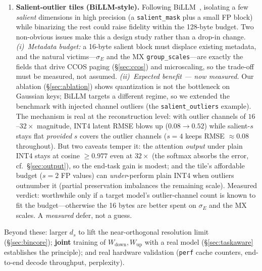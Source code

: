 \documentclass[11pt]{article}
\theoremstyle{plain}
\theoremstyle{definition}
\newcommand{\ds}{d_s}
\newcommand{\sigE}{\sigma_E}
\begin{document}
\begin{enumerate}[leftmargin=1.6em,itemsep=2pt]
    $\Rightarrow$ 128'' assumption we measured and discarded. For
    cross-compilation the host line size is irrelevant, so the safe 64-byte
    default holds. A portability refinement, not a correctness change: the tile
    stays 128~bytes with zero padding either way, and on every one of our
    targets the result is unchanged (\texttt{align(64)}).
  \item \textbf{Salient-outlier tiles (BiLLM-style).} Following
    BiLLM~\cite{billm}, isolating a few \emph{salient} dimensions in high
    precision (a \texttt{salient\_mask} plus a small FP block) while
    binarizing the rest could raise fidelity within the 128-byte budget. Two
    non-obvious issues make this a design study rather than a drop-in change.
    \emph{(i)~Metadata budget:} a 16-byte salient block must displace
    existing metadata, and the natural victims---$\sigE$ and the MX
    \texttt{group\_scales}---are exactly the fields that drive CCOS paging
    (\S\ref{sec:ccos}) and microscaling, so the trade-off must be measured,
    not assumed. \emph{(ii)~Expected benefit --- now measured.} Our ablation
    (\S\ref{sec:ablation}) shows quantization is not the bottleneck on Gaussian
    keys; BiLLM targets a different regime, so we extended the benchmark with
    injected channel outliers (the \texttt{salient\_outliers} example). The
    mechanism is real at the reconstruction level: with outlier channels of
    $16$--$32\times$ magnitude, INT4 latent RMSE blows up ($0.08\!\to\!0.52$)
    while salient-$s$ stays flat \emph{provided} $s$ covers the outlier channels
    ($s{=}4$ keeps RMSE $\approx 0.08$ throughout). But two caveats temper it:
    the attention \emph{output} under plain INT4 stays at cosine $\ge 0.977$
    even at $32\times$ (the softmax absorbs the error, cf.\
    \S\ref{sec:output}), so the end-task gain is modest; and the tile's
    affordable budget ($s{=}2$ FP values) can \emph{under}-perform plain INT4
    when outliers outnumber it (partial preservation imbalances the remaining
    scale). Measured verdict: worthwhile only if a target model's
    outlier-channel count is known to fit the budget---otherwise the 16 bytes
    are better spent on $\sigE$ and the MX scales. A \emph{measured} defer, not
    a guess.
\end{enumerate}

Beyond these: larger $\ds$ to lift the near-orthogonal resolution limit
(\S\ref{sec:bincore}); \textbf{joint} training of $W_{\text{down}},
W_{\text{up}}$ with a real model (\S\ref{sec:taskaware} establishes the
principle); and real hardware validation (\texttt{perf} cache counters,
end-to-end decode throughput, perplexity).
\end{document}
